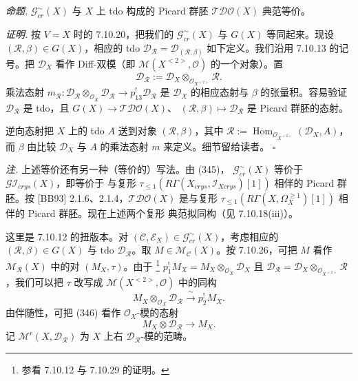  \emph{命题.} $\mathcal{G}^{\sim}_{cr}(X)$ 与 $X$ 上 tdo 构成的
Picard 群胚 $\mathcal{T}\mathcal{D}\mathcal{O}(X)$ 典范等价。

\emph{证明.} 按 $V=X$ 时的 7.10.20，把我们的 $\mathcal{G}^{\sim}_{cr}(X)$ 与
$G(X)$ 等同起来。现设 $(\mathcal{R},\beta)\in G(X)$，相应的 tdo
$\mathcal{D}_{\mathcal{R}}=\mathcal{D}_{(\mathcal{R},\beta)}$ 如下定义。我们沿用
7.10.13 的记号。把 $\mathcal{D}_X$ 看作 Diff-双模（即
$\mathcal{M}(X^{<2>},\mathcal{O})$ 的一个对象）。置
\[
\mathcal{D}_{\mathcal{R}}:=
\mathcal{D}_X\otimes_{\mathcal{O}_{X^{<2>}}}\mathcal{R}.
\]
乘法态射
$m_{\mathcal{R}}:\mathcal{D}_{\mathcal{R}}\otimes_{\mathcal{O}_X}
\mathcal{D}_{\mathcal{R}}\to p_{13}^{!}\mathcal{D}_{\mathcal{R}}$ 是
$\mathcal{D}_X$ 的相应态射与 $\beta$ 的张量积。容易验证
$\mathcal{D}_{\mathcal{R}}$ 是 tdo，且 $G(X)\to\mathcal{T}\mathcal{D}\mathcal{O}(X)$、
$(\mathcal{R},\beta)\mapsto\mathcal{D}_{\mathcal{R}}$ 是 Picard 群胚的态射。

逆向态射把 $X$ 上的 tdo $A$ 送到对象 $(\mathcal{R},\beta)$，其中
$\mathcal{R}:=\operatorname{Hom}_{\mathcal{O}_{X^{<2>}}}(\mathcal{D}_X,A)$，而
$\beta$ 由比较 $\mathcal{D}_X$ 与 $A$ 的乘法态射 $m$ 来定义。细节留给读者。
\hfill$\square$

 \emph{注.} 上述等价还有另一种（等价的）写法。由 (345)，
$\mathcal{G}^{\sim}_{cr}(X)$ 等价于 $\mathcal{G}\mathcal{I}_{crys}(X)$，即等价于
与复形 $\tau_{\le1}(R\Gamma(X_{crys},\mathcal{I}_{Xcrys})[1])$ 相伴的 Picard
群胚。按 [BB93] 2.1.6、2.1.4，$\mathcal{T}\mathcal{D}\mathcal{O}(X)$ 是与复形
$\tau_{\le1}(R\Gamma(X,\Omega_X^{\ge1})[1])$ 相伴的 Picard 群胚。现在上述两个复形
典范拟同构（见 7.10.18(iii)）。

 这里是 7.10.12 的扭版本。对
$(\mathcal{C},\mathcal{E}_X)\in\mathcal{G}^{\sim}_{cr}(X)$，考虑相应的
$(\mathcal{R},\beta)\in G(X)$ 与 tdo $\mathcal{D}_{\mathcal{R}}$。取
$M\in\mathcal{M}_{\mathcal{C}}(X)$。按 7.10.26，可把 $M$ 看作
$\mathcal{M}_{\mathcal{R}}(X)$ 中的对 $(M_X,\tau)$。由于%
\footnote{参看 7.10.12 与 7.10.29 的证明。}
$p_1^{!}M_X=M_X\otimes_{\mathcal{O}_X}\mathcal{D}_X$ 且
$\mathcal{D}_{\mathcal{R}}=
\mathcal{D}_X\otimes_{\mathcal{O}_{X^{<2>}}}\mathcal{R}$，我们可以把 $\tau$
改写成 $\mathcal{M}(X^{<2>},\mathcal{O})$ 中的同构
\begin{equation}\tag{346}
M_X\otimes_{\mathcal{O}_X}\mathcal{D}_{\mathcal{R}}
\xrightarrow{\ \sim\ }p_2^{!}M_X .
\end{equation}
由伴随性，可把 (346) 看作 $\mathcal{O}_X$-模的态射
\begin{equation}\tag{347}
M_X\otimes\mathcal{D}_{\mathcal{R}}\to M_X .
\end{equation}
记 $\mathcal{M}^{r}(X,\mathcal{D}_{\mathcal{R}})$ 为 $X$ 上右
$\mathcal{D}_{\mathcal{R}}$-模的范畴。

